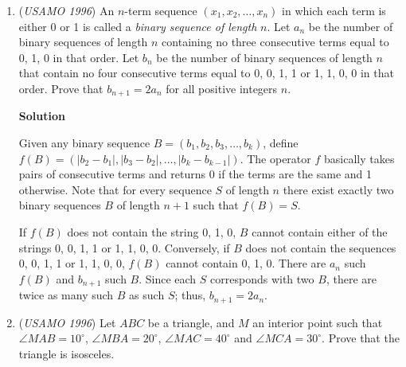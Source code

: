 \begin{enumerate}
\textbf{Solution}

Let the triangle be $ABC$. Assume $A$ is the largest angle. Let $AD$ be the altitude. Assume $AB \le AC$, so that $BD \le BC/2$. If $BD > \frac{BC}{3}$, then reflect in $AD$. If $B'$ is the reflection of $B$, then $B'D = BD$ and the intersection of the two triangles is just $ABB'$. But $BB' = 2BD > \frac{2}{3} BC$, so $ABB'$ has more than $\frac{2}{3}$ the area of $ABC$.

 If $BD < BC/3$, then reflect in the angle bisector of $C$. The reflection of $A'$ is a point on the segment $BD$ and not $D$. (It lies on the line $BC$ because we are reflecting in the angle bisector. $A'C > DC$ because $\angle{CAD} < \angle{CDA} = 90^{\circ}$. Finally, $A'C \le BC$ because we assumed $\angle B$ does not exceed $\angle A$). The intersection is at least $AA'C$. But  $\frac{[AA'C]}{[ABC]} = \frac{CA'}{CB} > CD/CB \ge 2/3$.

 


	\item (\textit{USAMO 1996}) An $n$-term sequence $(x_1, x_2, \ldots, x_n)$ in which each term is either 0 or 1 is called a \textit{binary sequence of length} $n$.  Let $a_n$ be the number of binary sequences of length $n$ containing no three consecutive terms equal to 0, 1, 0 in that order.  Let $b_n$ be the number of binary sequences of length $n$ that contain no four consecutive terms equal to 0, 0, 1, 1 or 1, 1, 0, 0 in that order. Prove that $b_{n+1} = 2a_n$ for all positive integers $n$.


 



\textbf{Solution}

Given any binary sequence $B=(b_1,b_2,b_3,\dots,b_k)$, define $f(B)=(|b_2-b_1|,|b_3-b_2|,\dots,|b_k-b_{k-1}|)$. The operator $f$ basically takes pairs of consecutive terms and returns 0 if the terms are the same and 1 otherwise. Note that for every sequence $S$ of length $n$ there exist exactly two binary sequences $B$ of length $n+1$ such that $f(B)=S$.

 If $f(B)$ does not contain the string 0, 1, 0, $B$ cannot contain either of the strings 0, 0, 1, 1 or 1, 1, 0, 0. Conversely, if $B$ does not contain the sequences 0, 0, 1, 1 or 1, 1, 0, 0, $f(B)$ cannot contain 0, 1, 0. There are $a_n$ such $f(B)$ and $b_{n+1}$ such $B$. Since each $S$ corresponds with two $B$, there are twice as many such $B$ as such $S$; thus, $b_{n+1}=2a_n$.

 


	\item (\textit{USAMO 1996}) Let $ABC$ be a triangle, and $M$ an interior point such that $\angle MAB=10^\circ$, $\angle MBA=20^\circ$, $\angle MAC=40^\circ$ and $\angle MCA=30^\circ$. Prove that the triangle is isosceles.



\end{enumerate}
